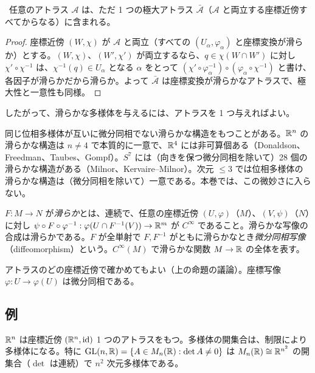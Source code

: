 \begin{prop}\label{A:prop:maxatlas}
\tP\ 任意のアトラス $\mathcal A$ は、ただ 1 つの極大アトラス $\bar{\mathcal A}$（$\mathcal A$ と両立する座標近傍すべてからなる）に含まれる。
\end{prop}
\begin{proof}
座標近傍 $(W,\chi)$ が $\mathcal A$ と両立（すべての $(U_\alpha,\varphi_\alpha)$ と座標変換が滑らか）とする。$(W,\chi)$、$(W',\chi')$ が両立するなら、$q\in\chi(W\cap W')$ に対し $\chi'^{}\circ\chi^{-1}$ は、$\chi^{-1}(q)\in U_\alpha$ となる $\alpha$ をとって $(\chi'\circ\varphi_\alpha^{-1})\circ(\varphi_\alpha\circ\chi^{-1})$ と書け、各因子が滑らかだから滑らか。よって $\bar{\mathcal A}$ は座標変換が滑らかなアトラスで、極大性と一意性も同様。
\end{proof}

したがって、滑らかな多様体を与えるには、アトラスを 1 つ与えればよい。

\begin{rem}[滑らかな構造の一意性]
同じ位相多様体が互いに微分同相でない滑らかな構造をもつことがある。$\R^n$ の滑らかな構造は $n\ne4$ で本質的に一意で、$\mathbb R^4$ には非可算個ある（Donaldson、Freedman、Taubes、Gompf\tC）。$S^7$ には（向きを保つ微分同相を除いて）28 個の滑らかな構造がある（Milnor、Kervaire--Milnor\tC）。次元 $\le3$ では位相多様体の滑らかな構造は（微分同相を除いて）一意である。本巻では、この微妙さに入らない。
\end{rem}

\begin{defn}[滑らかな写像]
$F:M\to N$ が\emph{滑らか}とは、連続で、任意の座標近傍 $(U,\varphi)$（$M$）、$(V,\psi)$（$N$）に対し $\psi\circ F\circ\varphi^{-1}:\varphi(U\cap F^{-1}(V))\to\mathbb R^m$ が $C^\infty$ であること。滑らかな写像の合成は滑らかである。$F$ が全単射で $F,F^{-1}$ がともに滑らかなとき\emph{微分同相写像}（diffeomorphism）という。$C^\infty(M)$ で滑らかな関数 $M\to\mathbb R$ の全体を表す。
\end{defn}

アトラスのどの座標近傍で確かめてもよい（上の命題の議論）。座標写像 $\varphi:U\to\varphi(U)$ は微分同相である。

\subsection{例}
\begin{ex}[$\R^n$ と開集合]
$\R^n$ は座標近傍 $(\mathbb R^n,\mathrm{id})$ 1 つのアトラスをもつ。多様体の開集合は、制限により多様体になる。特に $\mathrm{GL}(n,\mathbb R)=\{A\in M_n(\mathbb R):\det A\ne0\}$ は $M_n(\mathbb R)\cong\mathbb R^{n^2}$ の開集合（$\det$ は連続）で $n^2$ 次元多様体である。
\end{ex}

